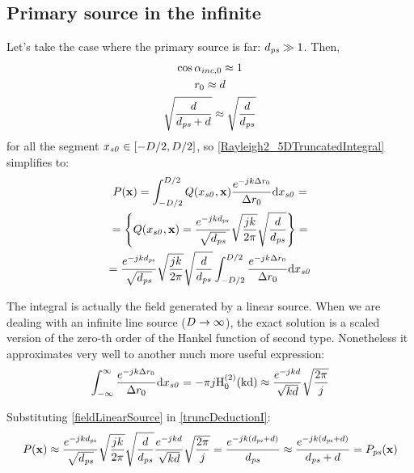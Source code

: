 \subsection{Primary source in the infinite}
Let's take the case where the primary source is far: $d_{\PosTheoSubInd[primarySource]} \gg 1$. Then,
\begin{gather*}
	\cos\normPrimaryPropAngleSection \approx 1 \\ \distLinePrimSource \approx d \\ \sqrt{\frac{d}{d_{\PosTheoSubInd[primarySource]} + d}} \approx \sqrt{\frac{d}{d_{\PosTheoSubInd[primarySource]}}}
\end{gather*}
for all the segment $\PosTheo[section][x] \in [-\sectionTheoLength/2, \sectionTheoLength/2]$, so \autoref{Rayleigh2_5DTruncatedIntegral} simplifies to:
\begin{multline}
	P(\PosTheo) = \int_{-\sectionTheoLength/2}^{\sectionTheoLength/2} Q(x_{\PosTheoSubInd[section]}, \PosTheo) \frac{e^{-jk\distLinePoint}}{\distLinePoint} \mathrm{d}\PosTheo[section][x] =\\
	= \left\{Q(x_{\PosTheoSubInd[section]}, \PosTheo) =  \frac{e^{-jkd_{\PosTheoSubInd[primarySource]}}}{\sqrt{d_{\PosTheoSubInd[primarySource]}}} \sqrt{\frac{j k}{2\pi}} \sqrt{\frac{d}{d_{\PosTheoSubInd[primarySource]}}}\right\} = \\
	= \frac{e^{-jkd_{\PosTheoSubInd[primarySource]}}}{\sqrt{d_{\PosTheoSubInd[primarySource]}}} \sqrt{\frac{j k}{2\pi}} \sqrt{\frac{d}{d_{\PosTheoSubInd[primarySource]}}} \int_{-\sectionTheoLength/2}^{\sectionTheoLength/2} \frac{e^{-jk\distLinePoint}}{\distLinePoint} \mathrm{d}\PosTheo[section][x]
	\label{truncDeductionI}
\end{multline}

The integral is actually the field generated by a linear source. When we are dealing with an infinite line source ($D \to \infty$), the exact solution is a scaled version of the zero-th order of the Hankel function of second type. Nonetheless it approximates very well to another much more useful expression:
\begin{equation}
\int_{-\infty}^{\infty} \frac{e^{-jk\distLinePoint}}{\distLinePoint} \mathrm{d}x_{\PosTheoSubInd[section]} = -\pi j \mathrm{H_0^{(2)}(k d)} \approx \frac{e^{-jkd}}{\sqrt{kd}}\sqrt{\frac{2\pi}{j}}
\label{fieldLinearSource}
\end{equation}

Substituting \autoref{fieldLinearSource} in \autoref{truncDeductionI}:
\begin{equation}
P(\PosTheo) \approx \frac{e^{-jkd_{\PosTheoSubInd[primarySource]}}}{\sqrt{d_{\PosTheoSubInd[primarySource]}}} \sqrt{\frac{j k}{2\pi}} \sqrt{\frac{d}{d_{\PosTheoSubInd[primarySource]}}} \frac{e^{-jkd}}{\sqrt{kd}}\sqrt{\frac{2\pi}{j}} = \frac{e^{-jk(d_{\PosTheoSubInd[primarySource]} + d)}}{d_{\PosTheoSubInd[primarySource]}} \approx \frac{e^{-jk(d_{\PosTheoSubInd[primarySource]} + d)}}{d_{\PosTheoSubInd[primarySource]} + d} = P_{\PosTheoSubInd[primarySource]}(\PosTheo)
\end{equation}

